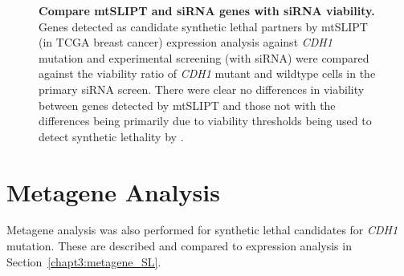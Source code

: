 \begin{figure}[!htp]
\begin{center}
   \end{center}
   \caption[Compare \acrshort{mtSLIPT} and \gls{siRNA} genes with \gls{siRNA} viability]{\small \textbf{Compare \acrshort{mtSLIPT} and \gls{siRNA} genes with \gls{siRNA} viability.}  Genes detected as candidate synthetic lethal partners by \acrshort{mtSLIPT} (in \gls{TCGA} breast cancer) expression analysis against \textit{CDH1} mutation and experimental screening (with \gls{siRNA}) were compared against the viability ratio of \textit{CDH1} mutant and wildtype cells in the primary \gls{siRNA} screen. There were clear no differences in viability between genes detected by \acrshort{mtSLIPT} and those not with the differences being primarily due to viability thresholds being used to detect synthetic lethality by \citet{Telford2015}. 
}
\label{fig:compare_viability_mtSL}
\end{figure}


\clearpage
\section{Metagene Analysis} \label{appendix:metagene_mtSL}

Metagene analysis was also performed for synthetic lethal candidates for \textit{CDH1} mutation. These are described and compared to expression analysis in Section~\ref{chapt3:metagene_SL}. 


